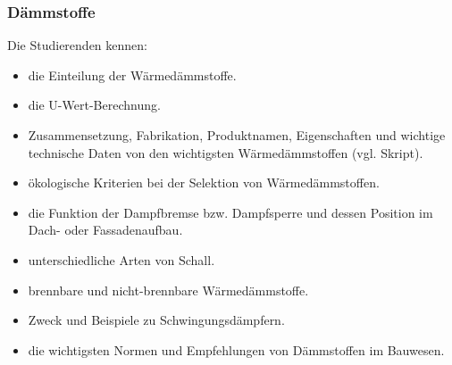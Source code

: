 \subsubsection*{Dämmstoffe}

Die Studierenden kennen: 

\begin{itemize}[noitemsep]
	\item die Einteilung der Wärmedämmstoffe.
	\item die U-Wert-Berechnung.
	\item Zusammensetzung, Fabrikation, Produktnamen, Eigenschaften und wichtige technische Daten von den wichtigsten Wärmedämmstoffen (vgl. Skript).
	\item ökologische Kriterien bei der Selektion von Wärmedämmstoffen.
	\item die Funktion der Dampfbremse bzw. Dampfsperre und dessen Position im Dach- oder Fassadenaufbau.
	\item  unterschiedliche Arten von Schall.
	\item brennbare und nicht-brennbare Wärmedämmstoffe.
	\item Zweck und Beispiele zu Schwingungsdämpfern.
	\item  die wichtigsten Normen und Empfehlungen von Dämmstoffen im Bauwesen.

\end{itemize}